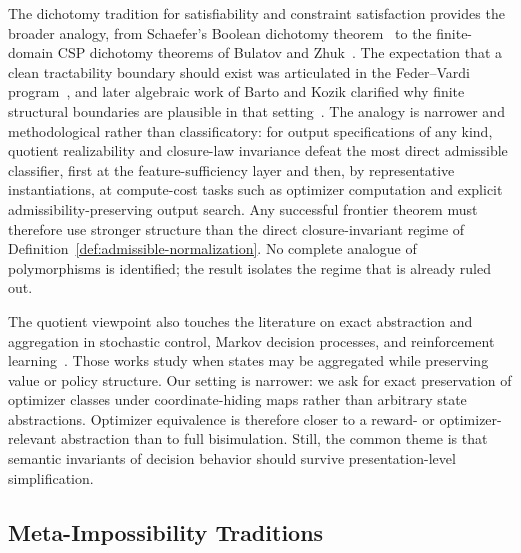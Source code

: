 The dichotomy tradition for satisfiability and constraint satisfaction provides the broader analogy, from Schaefer's Boolean dichotomy theorem~\cite{schaefer1978complexity} to the finite-domain CSP dichotomy theorems of Bulatov and Zhuk~\cite{bulatov2017dichotomy,zhuk2017proof}. The expectation that a clean tractability boundary should exist was articulated in the Feder--Vardi program~\cite{feder1998computational}, and later algebraic work of Barto and Kozik clarified why finite structural boundaries are plausible in that setting~\cite{barto2014constraint}. The analogy is narrower and methodological rather than classificatory: for output specifications of any kind, quotient realizability and closure-law invariance defeat the most direct admissible classifier, first at the feature-sufficiency layer and then, by representative instantiations, at compute-cost tasks such as optimizer computation and explicit admissibility-preserving output search. Any successful frontier theorem must therefore use stronger structure than the direct closure-invariant regime of Definition~\ref{def:admissible-normalization}. No complete analogue of polymorphisms is identified; the result isolates the regime that is already ruled out.

The quotient viewpoint also touches the literature on exact abstraction and aggregation in stochastic control, Markov decision processes, and reinforcement learning~\cite{papadimitriou1987mdp,givan2003equivalence,ravindran2004algebraic}. Those works study when states may be aggregated while preserving value or policy structure. Our setting is narrower: we ask for exact preservation of optimizer classes under coordinate-hiding maps rather than arbitrary state abstractions. Optimizer equivalence is therefore closer to a reward- or optimizer-relevant abstraction than to full bisimulation. Still, the common theme is that semantic invariants of decision behavior should survive presentation-level simplification.

\subsection*{Meta-Impossibility Traditions}

